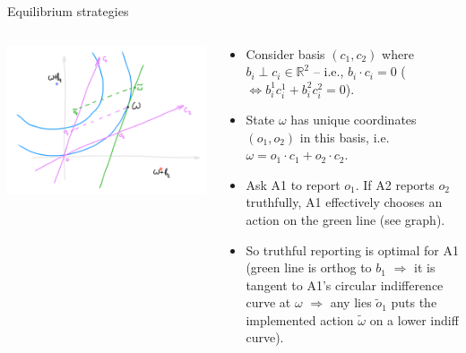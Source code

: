 \documentclass[english,10pt
,aspectratio=169
]{beamer}
\begin{document}
\begin{frame}{Equilibrium strategies}
	\begin{columns}
		\begin{column}{0.5\textwidth}
			\begin{center}
				\includegraphics[scale=0.65]{pics/M4/battaglini04.png}
			\end{center}
		\end{column}
		\begin{column}{0.5\textwidth}
			{\small
				\begin{itemize}
					\item Consider basis $(c_1,c_2)$ where $b_i \perp c_i \in \mathbb{R}^2$ -- i.e., $b_i \cdot c_i = 0$ ($\iff b_i^1 c_i^1 + b_i^2 c_i^2 = 0$). 
					\item State $\omega$ has unique coordinates $(o_1,o_2)$ in this basis, i.e. $\omega = o_1 \cdot c_1 + o_2 \cdot c_2$.
					\item Ask A1 to report $o_1$. If A2 reports $o_2$ truthfully, A1 effectively chooses an action on the green line (see graph). 
					\item So truthful reporting is optimal for A1 (green line is orthog to $b_1$ $\Rightarrow$ it is tangent to A1's circular indifference curve at $\omega$ $\Rightarrow$ any lies $\tilde{o}_1$ puts the implemented action $\tilde{\omega}$ on a lower indiff curve).
				\end{itemize}
			}
		\end{column}
	\end{columns}
\end{frame}
\end{document}
